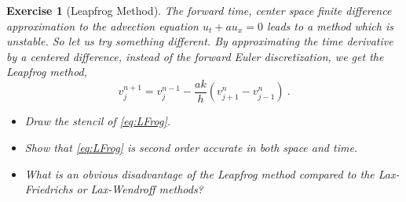 \documentclass[10pt,letterpaper]{article}
\theoremstyle{break}
\newtheorem{exercise}{Exercise}
\begin{document}
\begin{exercise}[Leapfrog Method]
	The forward time, center space finite difference
	approximation to the advection equation $u_t+au_x=0$
	leads to a method which is \emph{unstable}.
	So let us try something different.
	By approximating the time derivative by a centered difference,
	instead of the forward Euler discretization, we get the Leapfrog method,
	\begin{equation}\label{eq:LFrog}
		v_{j}^{n+1}=v_{j}^{n-1}-\frac{ak}{h}(v_{j+1}^{n}-v_{j-1}^{n})\ .
	\end{equation}
	\begin{itemize}
		\item[(i)]	Draw the stencil of \eqref{eq:LFrog}.

		\item[(ii)]	Show that \eqref{eq:LFrog} is second order accurate in both space and time.

		\item[(iii)] What is an obvious disadvantage of the Leapfrog method compared to the Lax-Friedrichs or Lax-Wendroff methods?
	\end{itemize}
\end{exercise}
\end{document}
